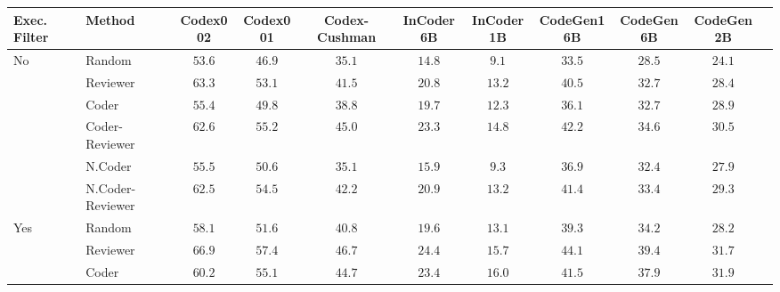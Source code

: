 \documentclass[nohyperref]{article}
\theoremstyle{plain}
\theoremstyle{definition}
\theoremstyle{remark}
\begin{document}
\begin{table*}[]
\setlength{\tabcolsep}{1.5pt}
\footnotesize
\centering
\begin{tabular}{l|lccccccccc}
\toprule
    Exec. Filter & Method &            Codex002 &            Codex001 &       Codex-Cushman &           InCoder6B &           InCoder1B &          CodeGen16B &           CodeGen6B &           CodeGen2B \\
\midrule
\multirow{6}{*}{No} & Random &              $53.6$ &              $46.9$ &              $35.1$ &              $14.8$ &               $9.1$ &              $33.5$ &              $28.5$ &              $24.1$ \\
    & Reviewer &              $63.3$ &              $53.1$ &              $41.5$ &              $20.8$ &              $13.2$ &              $40.5$ &              $32.7$ &              $28.4$ \\
\cmidrule{2-10}
    & Coder &              $55.4$ &              $49.8$ &              $38.8$ &              $19.7$ &              $12.3$ &              $36.1$ &              $32.7$ &              $28.9$ \\
    & Coder-Reviewer &              $62.6$ &              $55.2$ &              $45.0$ &              $23.3$ &              $14.8$ &              $42.2$ &              $34.6$ &              $30.5$ \\
\cmidrule{2-10}
    & N.Coder &              $55.5$ &              $50.6$ &              $35.1$ &              $15.9$ &               $9.3$ &              $36.9$ &              $32.4$ &              $27.9$ \\
    & N.Coder-Reviewer &              $62.5$ &              $54.5$ &              $42.2$ &              $20.9$ &              $13.2$ &              $41.4$ &              $33.4$ &              $29.3$ \\
\midrule
\multirow{7}{*}{Yes} & Random &              $58.1$ &              $51.6$ &              $40.8$ &              $19.6$ &              $13.1$ &              $39.3$ &              $34.2$ &              $28.2$ \\
    & Reviewer &     $\mathbf{66.9}$ &              $57.4$ &              $46.7$ &              $24.4$ &              $15.7$ &              $44.1$ &              $39.4$ &              $31.7$ \\
\cmidrule{2-10}
    & Coder &              $60.2$ &              $55.1$ &              $44.7$ &              $23.4$ &              $16.0$ &              $41.5$ &              $37.9$ &              $31.9$ \\

\end{tabular}
\end{table*}
\end{document}
